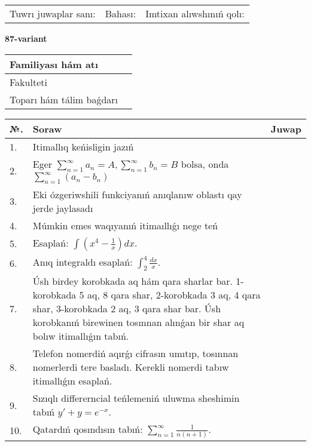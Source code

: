 \documentclass{article}
\begin{document}
\vspace{1cm}

\begin{tabular}{ c c c }
Tuwrı juwaplar sanı: \underline{\hspace{2cm}} & Bahası: \underline{\hspace{2cm}} & Imtixan alıwshınıń qolı: \underline{\hspace{2cm}} \\
\end{tabular}

\newpage

\begin{center}\textbf{87-variant}\end{center}

\bgroup
\def\arraystretch{1.5}
\begin{tabular}{ |m{6cm}|m{10cm}| }
  \hline
  Familiyası hám atı & \\
  \hline
  Fakulteti &\\
  \hline
  Toparı hám tálim baǵdarı & \\
  \hline
\end{tabular}
\egroup

\vspace{0.5cm}

\bgroup
\def\arraystretch{2}
\begin{tabular}{ |l|m{8cm}|m{7cm}| }
  \hline
  №. & Soraw & Juwap \\
  \hline
  1. & Itimallıq keńisligin jazıń &  \\
  \hline
  2. & Eger $\displaystyle\sum_{n = 1}^{\infty}a_{n} = A, \sum_{n = 1}^{\infty}b_{n} = B$ bolsa, onda $\displaystyle\sum_{n = 1}^{\infty}\left( a_{n} - b_{n} \right)$ &  \\
  \hline
  3. & Eki ózgeriwshili funkciyanıń anıqlanıw oblastı qay jerde jaylasadı &  \\
  \hline
  4. & Múmkin emes waqıyanıń itimaıllıǵı nege teń &  \\
  \hline
  5. & Esaplań: $\displaystyle\int \left( x^{4}-\frac{1}{x} \right)dx$. &  \\
  \hline
  6. & Anıq integraldı esaplań: $\displaystyle\int_{2}^{4}\frac{dx}{x}$. &  \\
  \hline
  7. & Úsh birdey korobkada aq hám qara sharlar bar. 1-korobkada 5 aq, 8 qara shar, 2-korobkada 3 aq, 4 qara shar, 3-korobkada 2 aq, 3 qara shar bar. Úsh korobkanıń birewinen tosınnan alınǵan bir shar aq bolıw itimallıǵın tabıń. &  \\
  \hline
  8. & Telefon nomerdiń aqırǵı cifrasın umıtıp, tosınnan nomerlerdi tere basladı. Kerekli nomerdi tabıw itimallıǵın esaplań. &  \\
  \hline
  9. & Sızıqlı differerncial teńlemeniń uluwma sheshimin tabıń $y' + y =e^{-x}$. &  \\
  \hline
  10. & Qatardıń qosındısın tabıń: $\displaystyle\sum_{n = 1}^{\infty}\frac{1}{n(n + 1)}$. &  \\
  \hline
\end{tabular}
\egroup
\end{document}
